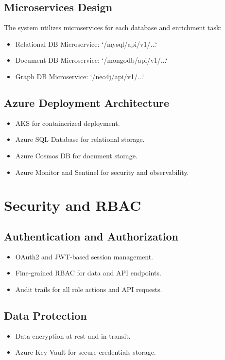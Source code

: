 \documentclass[12pt]{article}
\begin{document}
\subsection{Microservices Design}
The system utilizes microservices for each database and enrichment task:
\begin{itemize}
    \item Relational DB Microservice: `/mysql/api/v1/...`
    \item Document DB Microservice: `/mongodb/api/v1/...`
    \item Graph DB Microservice: `/neo4j/api/v1/...`
\end{itemize}

\subsection{Azure Deployment Architecture}
\begin{itemize}
    \item AKS for containerized deployment.
    \item Azure SQL Database for relational storage.
    \item Azure Cosmos DB for document storage.
    \item Azure Monitor and Sentinel for security and observability.
\end{itemize}

\section{Security and RBAC}
\subsection{Authentication and Authorization}
\begin{itemize}
    \item OAuth2 and JWT-based session management.
    \item Fine-grained RBAC for data and API endpoints.
    \item Audit trails for all role actions and API requests.
\end{itemize}

\subsection{Data Protection}
\begin{itemize}
    \item Data encryption at rest and in transit.
    \item Azure Key Vault for secure credentials storage.
\end{itemize}
\end{document}

